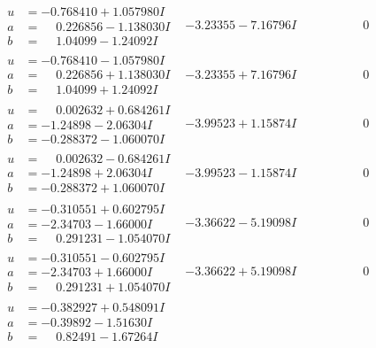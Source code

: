 \documentclass[1p]{elsarticle_modified}
\theoremstyle{definition}
\begin{document}
$$\begin{array}{c|c|c}
 \hline 
\begin{aligned}
u &= -0.768410 + 1.057980 I \\
a &= \phantom{-}0.226856 - 1.138030 I \\
b &= \phantom{-}1.04099 - 1.24092 I\end{aligned}
 & -3.23355 - 7.16796 I & \phantom{-0.000000 } 0 \\ \hline\begin{aligned}
u &= -0.768410 - 1.057980 I \\
a &= \phantom{-}0.226856 + 1.138030 I \\
b &= \phantom{-}1.04099 + 1.24092 I\end{aligned}
 & -3.23355 + 7.16796 I & \phantom{-0.000000 } 0 \\ \hline\begin{aligned}
u &= \phantom{-}0.002632 + 0.684261 I \\
a &= -1.24898 - 2.06304 I \\
b &= -0.288372 - 1.060070 I\end{aligned}
 & -3.99523 + 1.15874 I & \phantom{-0.000000 } 0 \\ \hline\begin{aligned}
u &= \phantom{-}0.002632 - 0.684261 I \\
a &= -1.24898 + 2.06304 I \\
b &= -0.288372 + 1.060070 I\end{aligned}
 & -3.99523 - 1.15874 I & \phantom{-0.000000 } 0 \\ \hline\begin{aligned}
u &= -0.310551 + 0.602795 I \\
a &= -2.34703 - 1.66000 I \\
b &= \phantom{-}0.291231 - 1.054070 I\end{aligned}
 & -3.36622 - 5.19098 I & \phantom{-0.000000 } 0 \\ \hline\begin{aligned}
u &= -0.310551 - 0.602795 I \\
a &= -2.34703 + 1.66000 I \\
b &= \phantom{-}0.291231 + 1.054070 I\end{aligned}
 & -3.36622 + 5.19098 I & \phantom{-0.000000 } 0 \\ \hline\begin{aligned}
u &= -0.382927 + 0.548091 I \\
a &= -0.39892 - 1.51630 I \\
b &= \phantom{-}0.82491 - 1.67264 I\end{aligned}

\end{array}$$
\end{document}
